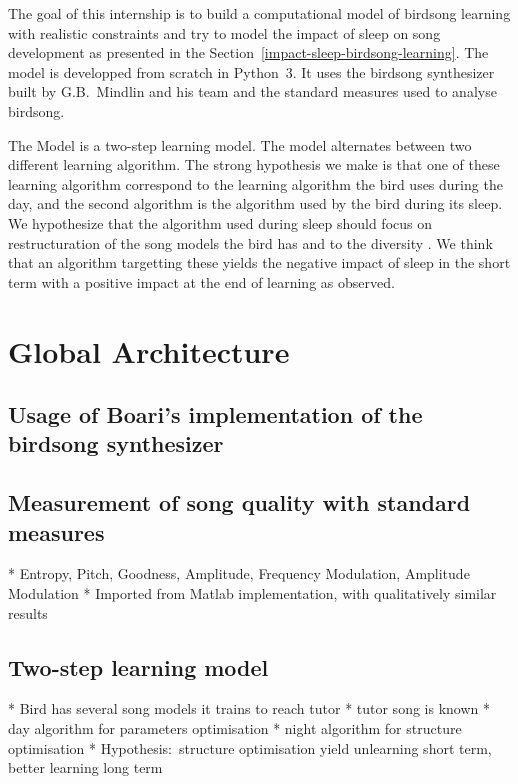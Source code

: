 \documentclass{report}
\begin{document}
The goal of this internship is to build a computational model of birdsong
learning with realistic constraints and try to model the impact of sleep on song
development as presented in the Section~\ref{impact-sleep-birdsong-learning}.
The model is developped from scratch in Python~3. It uses the birdsong
synthesizer built by G.B.~Mindlin and his team and the standard measures used to
analyse birdsong.

The Model is a two-step learning model. The model alternates between two
different learning algorithm. The strong hypothesis we make is that one of these
learning algorithm correspond to the learning algorithm the bird uses during the
day, and  the second algorithm is the algorithm used by the bird during its
sleep. We hypothesize that the algorithm used during sleep should focus on
restructuration of the song models the bird has and to the diversity . We think
that an algorithm targetting these\todo{} yields the negative impact of sleep in
the short term with a positive impact at the end of learning as
\textcite{deregnaucourt_how_2005} observed.

\section{Global Architecture} \label{global-architecture}

\subsection{Usage of Boari's implementation of the birdsong synthesizer}
\label{usage-of-boaris-implementation-of-the-birdsong-synthesizer}

\subsection{Measurement of song quality with standard measures}
\label{measures}

  * Entropy, Pitch, Goodness, Amplitude, Frequency Modulation, Amplitude
  Modulation
  * Imported from Matlab implementation, with qualitatively similar
  results

\subsection{Two-step learning model} \label{two-step-learning-model}

  * Bird has several song models it trains to reach tutor
  * tutor song is known
  * day algorithm for parameters optimisation
  * night algorithm for structure optimisation
  * Hypothesis:~structure optimisation yield unlearning short term, better
  learning long term
\end{document}
